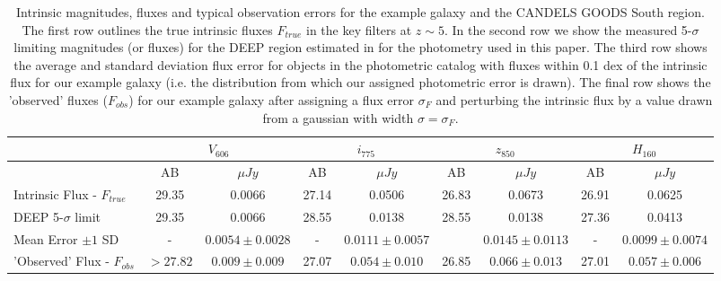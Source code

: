 \begin{landscape}
\begin{table}
    \centering
    \label{tab:eg_photom}
    \caption[Short caption]{Intrinsic magnitudes, fluxes and typical observation errors for the example galaxy and the CANDELS GOODS South region. The first row outlines the true intrinsic fluxes $F_{true}$ in the key filters at $z\sim5$. In the second row we show the measured 5-$\sigma$ limiting magnitudes (or fluxes) for the DEEP region estimated in \citet{Guo:2013ig} for the photometry used in this paper. The third row shows the average and standard deviation flux error for objects in the photometric catalog \citep{Guo:2013ig} with fluxes within 0.1 dex of the intrinsic flux for our example galaxy (i.e. the distribution from which our assigned photometric error is drawn). The final row shows the 'observed' fluxes ($F_{obs}$) for our example galaxy after assigning a flux error $\sigma_{F}$ and perturbing the intrinsic flux by a value drawn from a gaussian with width $\sigma = \sigma_{F}$.}
    \begin{tabular}{lcccccccc}
    \hline
    ~                      & \multicolumn{2}{c}{$V_{606}$} & \multicolumn{2}{c}{$i_{775}$} & \multicolumn{2}{c}{$z_{850}$} & \multicolumn{2}{c}{$H_{160}$} \\ \hline
    ~                      & AB        & $\mu Jy$ & AB & $\mu Jy$ & AB & $\mu Jy$ & AB   & $\mu Jy$ \\ \hline
    Intrinsic Flux - $F_{true}$           & 29.35         & 0.0066   & 27.14  & 0.0506  & 26.83  & 0.0673 & 26.91 &  0.0625  \\
    DEEP 5-$\sigma$ limit   & 29.35        & 0.0066   & 28.55  & 0.0138  & 28.55  & 0.0138 & 27.36 &  0.0413   \\
    Mean Error $\pm 1$ SD  & -         & $0.0054\pm0.0028$    & -  & $0.0111 \pm  0.0057$  &   & $0.0145 \pm 0.0113$   &   -   & $0.0099 \pm 0.0074$ \\ 
    'Observed' Flux - $F_{obs}$  & $>27.82$     & $0.009 \pm 0.009$  & 27.07  & $0.054\pm0.010$  & 26.85 & $0.066\pm0.013$   & 27.01        & $0.057 \pm 0.006$   \\
    \hline
    \end{tabular}
\end{table}
\end{landscape}
 
